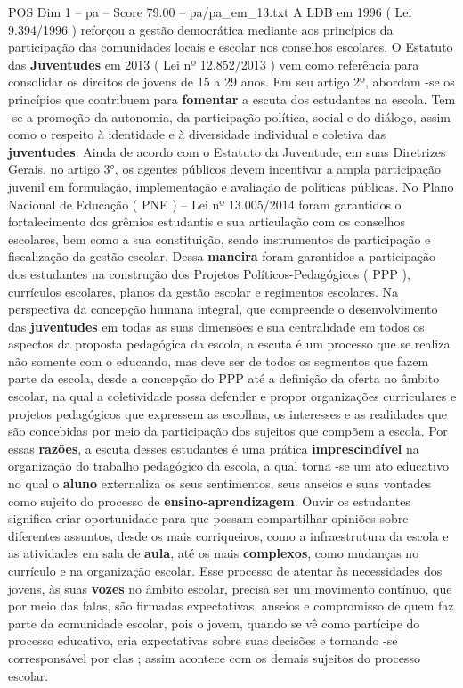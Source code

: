 \begin{textsample}{POS Dim 1 – pa – Score 79.00 – pa/pa\_em\_13.txt}
A LDB em 1996 ( Lei 9.394/1996 ) reforçou a gestão democrática mediante aos princípios da participação das comunidades locais e escolar nos conselhos escolares.
O Estatuto das \textbf{Juventudes} em 2013 ( Lei nº 12.852/2013 ) vem como referência para consolidar os direitos de jovens de 15 a 29 anos.
Em seu artigo 2º, abordam -se os princípios que contribuem para \textbf{fomentar} a escuta dos estudantes na escola.
Tem -se a promoção da autonomia, da participação política, social e do diálogo, assim como o respeito à identidade e à diversidade individual e coletiva das \textbf{juventudes}.
Ainda de acordo com o Estatuto da Juventude, em suas Diretrizes Gerais, no artigo 3{\EmojiFont °}, os agentes públicos devem incentivar a ampla participação juvenil em formulação, implementação e avaliação de políticas públicas.
No Plano Nacional de Educação ( PNE ) – Lei nº 13.005/2014 foram garantidos o fortalecimento dos grêmios estudantis e sua articulação com os conselhos escolares, bem como a sua constituição, sendo instrumentos de participação e fiscalização da gestão escolar.
Dessa \textbf{maneira} foram garantidos a participação dos estudantes na construção dos Projetos Políticos-Pedagógicos ( PPP ), currículos escolares, planos da gestão escolar e regimentos escolares.
Na perspectiva da concepção humana integral, que compreende o desenvolvimento das \textbf{juventudes} em todas as suas dimensões e sua centralidade em todos os aspectos da proposta pedagógica da escola, a escuta é um processo que se realiza não somente com o educando, mas deve ser de todos os segmentos que fazem parte da escola, desde a concepção do PPP até a definição da oferta no âmbito escolar, na qual a coletividade possa defender e propor organizações curriculares e projetos pedagógicos que expressem as escolhas, os interesses e as realidades que são concebidas por meio da participação dos sujeitos que compõem a escola.
Por essas \textbf{razões}, a escuta desses estudantes é uma prática \textbf{imprescindível} na organização do trabalho pedagógico da escola, a qual torna -se um ato educativo no qual o \textbf{aluno} externaliza os seus sentimentos, seus anseios e suas vontades como sujeito do processo de \textbf{ensino-aprendizagem}.
Ouvir os estudantes significa criar oportunidade para que possam compartilhar opiniões sobre diferentes assuntos, desde os mais corriqueiros, como a infraestrutura da escola e as atividades em sala de \textbf{aula}, até os mais \textbf{complexos}, como mudanças no currículo e na organização escolar.
Esse processo de atentar às necessidades dos jovens, às suas \textbf{vozes} no âmbito escolar, precisa ser um movimento contínuo, que por meio das falas, são firmadas expectativas, anseios e compromisso de quem faz parte da comunidade escolar, pois o jovem, quando se vê como partícipe do processo educativo, cria expectativas sobre suas decisões e tornando -se corresponsável por elas ; assim acontece com os demais sujeitos do processo escolar.

\end{textsample}
